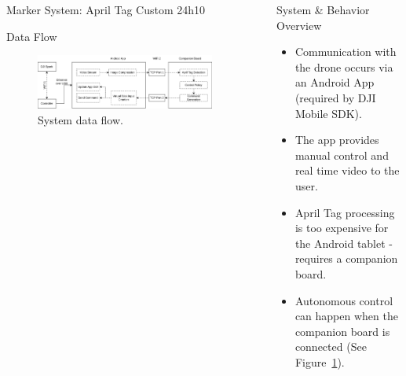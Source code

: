 \documentclass[final, 20pt]{beamer}
\newlength{\sepwidth}
\newlength{\colwidth}
\newcommand{\separatorcolumn}{\begin{column}{\sepwidth}\end{column}}
\begin{document}
\begin{frame}[t]
\begin{columns}[t]
\begin{column}{\colwidth}
\begin{block}{Marker System: April Tag Custom 24h10}
  \end{block}

  \begin{alertblock}{Data Flow}

    \begin{figure}
      \centering
      \includegraphics[width=\linewidth]{images/spark_architecture.drawio.png}
      \caption{System data flow.}
      \label{figure:data_flow}
    \end{figure}

  \end{alertblock}

\end{column}

\separatorcolumn

\begin{column}{\colwidth}

  \begin{alertblock}{System \& Behavior Overview}

    \begin{itemize}
      \item Communication with the drone occurs via an Android App (required by DJI Mobile SDK).
      \item The app provides manual control and real time video to the user.
      \item April Tag processing is too expensive for the Android tablet - requires a companion board.
      \item Autonomous control can happen when the companion board is connected (See Figure~\ref{figure:data_flow}).
    \end{itemize}


\end{alertblock}
\end{column}
\end{columns}
\end{frame}
\end{document}
